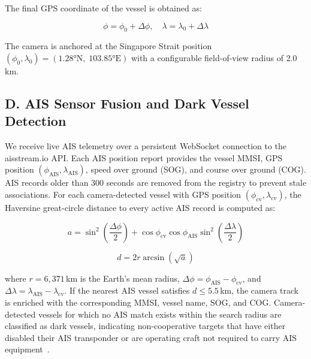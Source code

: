 \documentclass{ieeeaccess}
\begin{document}
The final GPS coordinate of the vessel is obtained as:

\begin{equation}
\phi = \phi_0 + \Delta\phi, \quad \lambda = \lambda_0 + \Delta\lambda
\end{equation}

The camera is anchored at the Singapore Strait position 
$(\phi_0, \lambda_0) = (1.28°\text{N},\; 103.85°\text{E})$ with a 
configurable field-of-view radius of 2.0\,km.

\subsection*{D. AIS Sensor Fusion and Dark Vessel Detection}

We receive live AIS telemetry over a persistent WebSocket connection 
to the aisstream.io API. Each AIS position report provides the vessel 
MMSI, GPS position $(\phi_{\text{AIS}}, \lambda_{\text{AIS}})$, speed 
over ground (SOG), and course over ground (COG). AIS records older 
than 300 seconds are removed from the registry to prevent stale 
associations. For each camera-detected vessel with GPS position 
$(\phi_{\text{cv}}, \lambda_{\text{cv}})$, the Haversine great-circle 
distance to every active AIS record is computed as:

\begin{equation}
a = \sin^2\!\left(\frac{\Delta\phi}{2}\right) + 
\cos\phi_{\text{cv}}\cos\phi_{\text{AIS}}
\sin^2\!\left(\frac{\Delta\lambda}{2}\right)
\end{equation}

\begin{equation}
d = 2r \arcsin\!\left(\sqrt{a}\right)
\end{equation}

where $r = 6{,}371$\,km is the Earth's mean radius, 
$\Delta\phi = \phi_{\text{AIS}} - \phi_{\text{cv}}$, and 
$\Delta\lambda = \lambda_{\text{AIS}} - \lambda_{\text{cv}}$. 
If the nearest AIS vessel satisfies $d \leq 5.5$\,km, the camera 
track is enriched with the corresponding MMSI, vessel name, SOG, 
and COG. Camera-detected vessels for which no AIS match exists 
within the search radius are classified as dark vessels, 
indicating non-cooperative targets that have either disabled 
their AIS transponder or are operating craft not required to 
carry AIS equipment~\cite{b4}.
\end{document}
